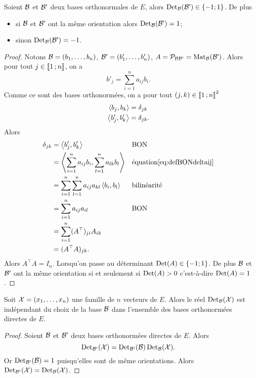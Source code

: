 \begin{lemme}
  Soient \(\mathcal{B}\) et \(\mathcal{B}'\) deux bases orthonormales de \(E\), alors 
  \(\operatorname{Det}_{\mathcal{B}}(\mathcal{B}') \in \{-1; 1\}\). De plus
  \begin{itemize}
    \item si \(\mathcal{B}\) et \(\mathcal{B}'\) ont la même orientation alors 
      \(\operatorname{Det}_{\mathcal{B}}(\mathcal{B}')=1\);
    \item sinon \(\operatorname{Det}_{\mathcal{B}}(\mathcal{B}')=-1\).
  \end{itemize}
\end{lemme}
\begin{proof}
  Notons \(\mathcal{B}=(b_1, \ldots, b_n)\), \(\mathcal{B}'=(b'_1, \ldots, b'_n)\), \(A=\mathcal{P}_{\mathcal{B} 
  \mathcal{B}'}=\mathrm{Mat}_{\mathcal{B}}(\mathcal{B}')\). Alors pour tout \(j \in \mathopen{\llbracket}1\mathclose{}\mathpunct{};n\mathclose{\rrbracket}\), on a
  \begin{equation}
    b'_j = \sum_{i=1}^na_{ij}b_i. \label{eq:defBONdeltaij}
  \end{equation}
  Comme ce sont des bases orthonormées, on a pour tout \((j,k) \in 
  \mathopen{\llbracket}1\mathclose{}\mathpunct{};n\mathclose{\rrbracket}^2\)
  \begin{align}
    \left\langle{b_j},{b_k}\right\rangle &= \delta_{jk} \\
    \left\langle{b'_j},{b'_k}\right\rangle &= \delta_{jk}.
  \end{align}
  Alors
  \begin{align*}
    \delta_{jk} &= \left\langle{b'_j},{b'_k}\right\rangle && \text{BON}\\
    &=\left\langle{\sum_{i=1}^na_{ij}b_i},{\sum_{l=1}^na_{lk}b_l}\right\rangle && \text{équation} 
    \eqref{eq:defBONdeltaij}\\
    &=\sum_{i=1}^n\sum_{l=1}^n a_{ij}a_{kl} \left\langle{b_i},{b_l}\right\rangle && 
    \text{bilinéarité}\\
    &=\sum_{i=1}^na_{ij}a_{il} && \text{BON}\\
    &=\sum_{i=1}^n (A^\top)_{ji}A_{ik} \\
    &=(A^\top A)_{jk}.
  \end{align*}
  Alors \(A^\top A=I_n\). Lorsqu'on passe au déterminant \(\operatorname{Det}(A) \in \{-1; 
  1\}\). De plus \(\mathcal{B}\) et \(\mathcal{B}'\) ont la même orientation si et seulement si 
  \(\operatorname{Det}(A)>0\) c'est-à-dire \(\operatorname{Det}(A)=1\).
\end{proof}
\begin{lemme}
  Soit \(\mathcal{X}=(x_1, \ldots, x_n)\) une famille de \(n\) vecteurs de \(E\). Alors 
  le réel \(\operatorname{Det}_{\mathcal{B}}(\mathcal{X})\) est indépendant du choix de la base \(\mathcal{B}\) dans 
  l'ensemble des bases orthonormées directes de \(E\).
\end{lemme}
\begin{proof}
  Soient \(\mathcal{B}\) et \(\mathcal{B}'\) deux bases orthonormées directes de \(E\). Alors
  \begin{equation}
    \operatorname{Det}_{\mathcal{B}'}(\mathcal{X}) = \operatorname{Det}_{\mathcal{B}'}(\mathcal{B}) \operatorname{Det}_{\mathcal{B}}(\mathcal{X}).
  \end{equation}
  Or \(\operatorname{Det}_{\mathcal{B}'}(\mathcal{B})=1\) puisqu'elles sont de même orientations. Alors 
  \(\operatorname{Det}_{\mathcal{B}'}(\mathcal{X}) = \operatorname{Det}_{\mathcal{B}}(\mathcal{X})\).
\end{proof}
